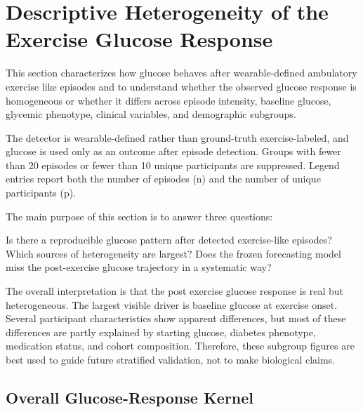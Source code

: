 
\section{Descriptive Heterogeneity of the Exercise Glucose Response}
\label{sec:exercise_subgroup}

This section characterizes how glucose behaves after wearable-defined ambulatory exercise like episodes and to understand whether the observed glucose response is homogeneous or whether it differs across episode intensity, baseline glucose, glycemic phenotype, clinical variables, and demographic subgroups.

The detector is wearable-defined rather than ground-truth exercise-labeled, and glucose is used only as an outcome after episode detection. Groups with fewer than 20 episodes or fewer than 10 unique participants are suppressed. Legend entries report both the number of episodes (n) and the number of unique participants (p).

The main purpose of this section is to answer three questions:

Is there a reproducible glucose pattern after detected exercise-like episodes?
Which sources of heterogeneity are largest?
Does the frozen forecasting model miss the post-exercise glucose trajectory in a systematic way?

The overall interpretation is that the post exercise glucose response is real but heterogeneous. The largest visible driver is baseline glucose at exercise onset. Several participant characteristics show apparent differences, but most of these differences are partly explained by starting glucose, diabetes phenotype, medication status, and cohort composition. Therefore, these subgroup figures are best used to guide future stratified validation, not to make biological claims.


\subsection{Overall Glucose-Response Kernel}
\label{subsec:ex_kernel_overall}

